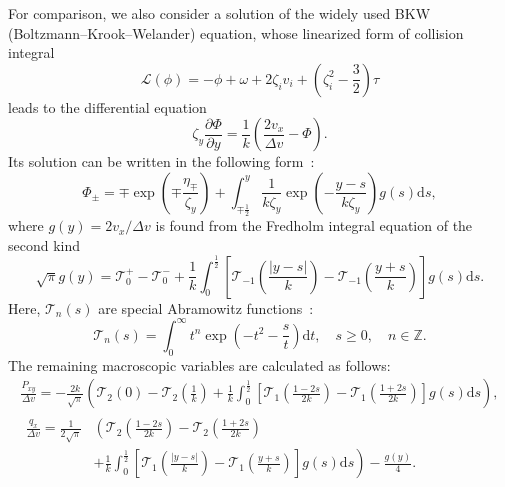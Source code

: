 \documentclass[aip,pof,preprint]{revtex4-1}
\newcommand{\dd}{\mathrm{d}}
\newcommand{\pder}[2][]{\frac{\partial#1}{\partial#2}}
\begin{document}
For comparison, we also consider a solution of the widely used BKW (Boltzmann--Krook--Welander) equation,
whose linearized form of collision integral
\begin{equation}\label{eq:linear_bkw}
    \mathcal{L}(\phi) = -\phi + \omega + 2\zeta_i v_i + \left(\zeta_i^2-\frac32\right)\tau
\end{equation}
leads to the differential equation
\begin{equation}\label{eq:linear_bkw_equation}
    \zeta_y \pder[\Phi]{y} = \frac1{k}\left( \frac{2v_x}{\Delta{v}} - \Phi \right).
\end{equation}
Its solution can be written in the following form~\cite{Willis1962}:
\begin{equation}\label{eq:bkw_solution}
    \Phi_\pm = \mp \exp\left(\mp\frac{\eta_\mp}{\zeta_y}\right) +
        \int_{\mp\frac12}^y \frac1{k\zeta_y} \exp \left(-\frac{y-s}{k\zeta_y}\right) g(s) \dd{s},
\end{equation}
where \(g(y) = 2v_x/\Delta v\) is found from the Fredholm integral equation of the second kind
\begin{equation}\label{eq:bkw_g_equation}
    \sqrt\pi g(y) = \mathcal{T}_0^+ - \mathcal{T}_0^-
        + \frac1k \int_0^{\frac12} \left[ \mathcal{T}_{-1}\left(\frac{|y-s|}{k}\right)
        - \mathcal{T}_{-1}\left(\frac{y+s}{k}\right) \right] g(s) \dd{s}.
\end{equation}
Here, \(\mathcal{T}_n(s)\) are special Abramowitz functions~\cite{Abramowitz1972}:
\begin{equation}\label{eq:Abramowitz}
    \mathcal{T}_n(s) = \int_0^\infty t^n \exp\left(-t^2-\frac{s}{t}\right) \dd t,
    \quad s\ge0, \quad n \in \mathbb{Z}.
\end{equation}
The remaining macroscopic variables are calculated as follows:
\begin{gather}
    \frac{P_{xy}}{\Delta v} = -\frac{2k}{\sqrt\pi} \left(
        \mathcal{T}_2(0)-\mathcal{T}_2\left(\frac1k\right)
        + \frac1k\int_0^{\frac12}\left[
            \mathcal{T}_1\left(\frac{1-2s}{2k}\right)-\mathcal{T}_1\left(\frac{1+2s}{2k}\right)
        \right]g(s)\dd{s}
        \right), \label{eq:bkw_macro_Pxy} \\
    \begin{aligned}
    \frac{q_x}{\Delta v} = \frac1{2\sqrt\pi}&\left(
        \mathcal{T}_2\left(\frac{1-2s}{2k}\right) - \mathcal{T}_2\left(\frac{1+2s}{2k}\right)\right. \\
        &+\left. \frac1k\int_0^{\frac12}\left[
            \mathcal{T}_1\left(\frac{|y-s|}k\right)-\mathcal{T}_1\left(\frac{y+s}k\right)
        \right]g(s)\dd{s}
        \right) - \frac{g(y)}4.
    \end{aligned} \label{eq:bkw_macro_qx}
\end{gather}
\end{document}

